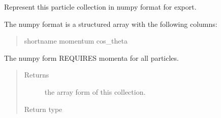 \documentclass[letterpaper,10pt,english]{sphinxmanual}
\begin{document}
\begin{fulllineitems}
\begin{fulllineitems}
\label{\detokenize{code_structure:scdc.particle.ParticleCollection.to_npy}}
Represent this particle collection in numpy format for export.

The numpy format is a structured array with the following columns:
\begin{quote}

shortname    momentum    cos\_theta
\end{quote}

The numpy form REQUIRES momenta for all particles.
\begin{quote}\begin{description}
\item[{Returns}] \leavevmode
the array form of this collection.

\item[{Return type}] \leavevmode
{}

\end{description}\end{quote}

\end{fulllineitems}


\end{fulllineitems}

\end{document}
